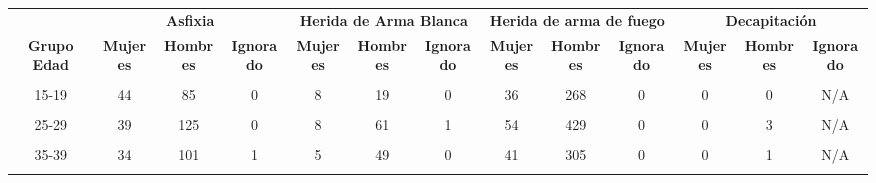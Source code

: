 \begin{tabular}[t]{ccccccccccccc}
\toprule
\multicolumn{1}{c}{\textbf{ }} & \multicolumn{3}{c}{\textbf{Asfixia}} & \multicolumn{3}{c}{\textbf{Herida de Arma Blanca}} & \multicolumn{3}{c}{\textbf{Herida de arma de fuego}} & \multicolumn{3}{c}{\textbf{Decapitación}} \\
\cmidrule(l{3pt}r{3pt}){2-4} \cmidrule(l{3pt}r{3pt}){5-7} \cmidrule(l{3pt}r{3pt}){8-10} \cmidrule(l{3pt}r{3pt}){11-13}
\textbf{Grupo Edad} & \textbf{Mujeres} & \textbf{Hombres} & \textbf{Ignorado} & \textbf{Mujeres} & \textbf{Hombres} & \textbf{Ignorado} & \textbf{Mujeres} & \textbf{Hombres} & \textbf{Ignorado} & \textbf{Mujeres} & \textbf{Hombres} & \textbf{Ignorado}\\
\midrule
\cellcolor[HTML]{B6B3FF}{Menor de 15} & \cellcolor[HTML]{B6B3FF}{58} & \cellcolor[HTML]{B6B3FF}{88} & \cellcolor[HTML]{B6B3FF}{0} & \cellcolor[HTML]{B6B3FF}{2} & \cellcolor[HTML]{B6B3FF}{3} & \cellcolor[HTML]{B6B3FF}{0} & \cellcolor[HTML]{B6B3FF}{15} & \cellcolor[HTML]{B6B3FF}{32} & \cellcolor[HTML]{B6B3FF}{0} & \cellcolor[HTML]{B6B3FF}{0} & \cellcolor[HTML]{B6B3FF}{0} & \cellcolor[HTML]{B6B3FF}{N/A}\\
15-19 & 44 & 85 & 0 & 8 & 19 & 0 & 36 & 268 & 0 & 0 & 0 & N/A\\
\cellcolor[HTML]{B6B3FF}{20-24} & \cellcolor[HTML]{B6B3FF}{38} & \cellcolor[HTML]{B6B3FF}{133} & \cellcolor[HTML]{B6B3FF}{0} & \cellcolor[HTML]{B6B3FF}{3} & \cellcolor[HTML]{B6B3FF}{47} & \cellcolor[HTML]{B6B3FF}{0} & \cellcolor[HTML]{B6B3FF}{64} & \cellcolor[HTML]{B6B3FF}{478} & \cellcolor[HTML]{B6B3FF}{0} & \cellcolor[HTML]{B6B3FF}{1} & \cellcolor[HTML]{B6B3FF}{0} & \cellcolor[HTML]{B6B3FF}{N/A}\\
25-29 & 39 & 125 & 0 & 8 & 61 & 1 & 54 & 429 & 0 & 0 & 3 & N/A\\
\cellcolor[HTML]{B6B3FF}{30-34} & \cellcolor[HTML]{B6B3FF}{25} & \cellcolor[HTML]{B6B3FF}{124} & \cellcolor[HTML]{B6B3FF}{0} & \cellcolor[HTML]{B6B3FF}{5} & \cellcolor[HTML]{B6B3FF}{42} & \cellcolor[HTML]{B6B3FF}{0} & \cellcolor[HTML]{B6B3FF}{47} & \cellcolor[HTML]{B6B3FF}{347} & \cellcolor[HTML]{B6B3FF}{0} & \cellcolor[HTML]{B6B3FF}{0} & \cellcolor[HTML]{B6B3FF}{0} & \cellcolor[HTML]{B6B3FF}{N/A}\\
35-39 & 34 & 101 & 1 & 5 & 49 & 0 & 41 & 305 & 0 & 0 & 1 & N/A\\
\cellcolor[HTML]{B6B3FF}{40-44} & \cellcolor[HTML]{B6B3FF}{13} & \cellcolor[HTML]{B6B3FF}{87} & \cellcolor[HTML]{B6B3FF}{0} & \cellcolor[HTML]{B6B3FF}{4} & \cellcolor[HTML]{B6B3FF}{28} & \cellcolor[HTML]{B6B3FF}{0} & \cellcolor[HTML]{B6B3FF}{48} & \cellcolor[HTML]{B6B3FF}{245} & \cellcolor[HTML]{B6B3FF}{0} & \cellcolor[HTML]{B6B3FF}{0} & \cellcolor[HTML]{B6B3FF}{0} & \cellcolor[HTML]{B6B3FF}{N/A}\\

\end{tabular}
